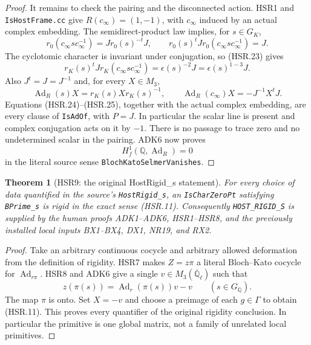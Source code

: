 \documentclass[11pt,a4paper]{article}
\numberwithin{equation}{section}
\newtheorem{theorem}{Theorem}[section]
\theoremstyle{remark}\newtheorem{remark}[theorem]{Remark}
\begin{document}
\begin{proof}
It remains to check the pairing and the disconnected action.
HSR1 and \texttt{Is\allowbreak Host\allowbreak Frame.\allowbreak cc} give
$R(c_\infty)=(1,-1)$, with $c_\infty$ induced by an actual
complex embedding.  The semidirect-product law implies, for
$s\in G_K$,
\[
 r_0(c_\infty s c_\infty^{-1})
      =Jr_0(s)^{-t}J,\qquad
 r_0(s)^tJr_0(c_\infty s c_\infty^{-1})=J.
\]
The cyclotomic character is invariant under conjugation, so
(HSR.23) gives
\[
 r_K(s)^tJr_K(c_\infty s c_\infty^{-1})
                       =\epsilon(s)^{-2}J
                       =\epsilon(s)^{1-3}J.
 \tag{HSR.24}
\]
Also $J^t=J=J^{-1}$ and, for every $X\in M_3$,
\[
 \operatorname{Ad}_R(s)X=r_K(s)Xr_K(s)^{-1},\qquad
 \operatorname{Ad}_R(c_\infty)X=-J^{-1}X^tJ.
 \tag{HSR.25}
\]
Equations (HSR.24)--(HSR.25), together with the actual complex
embedding, are every clause of \texttt{Is\allowbreak Ad\allowbreak Of}, with $P=J$.
In particular the scalar line is present and complex conjugation
acts on it by $-1$.  There is no passage to trace zero and no
undetermined scalar in the pairing.  ADK6 now proves
\[
 H^1_f(\mathbb Q,\operatorname{Ad}_R)=0
\]
in the literal source sense \texttt{Bloch\allowbreak Kato\allowbreak Selmer\allowbreak Vanishes}.
\end{proof}

\begin{theorem}[HSR9: the original HostRigid\_\allowbreak s statement]
\label{claim:HSR9}
For every choice of data quantified in the source's
\texttt{Host\allowbreak Rigid\_\allowbreak s}, an \texttt{Is\allowbreak Char\allowbreak Zero\allowbreak Pt} satisfying
\texttt{BPrime\_\allowbreak s} is rigid in the exact sense (HSR.11).
Consequently \texttt{HOST\_\allowbreak RIGID\_\allowbreak S} is supplied by the
human proofs ADK1--ADK6, HSR1--HSR8, and the previously installed
local inputs BX1--BX4, DX1, NR19, and RX2.
\end{theorem}
\begin{proof}
Take an arbitrary continuous cocycle and arbitrary allowed
deformation from the definition of rigidity.  HSR7 makes
$Z=z\pi$ a literal Bloch--Kato cocycle for
$\operatorname{Ad}_{r\pi}$.  HSR8 and ADK6 give a single
$v\in M_3(\overline{\mathbb Q}_\ell)$ such that
\[
 z(\pi(s))=\operatorname{Ad}_r(\pi(s))v-v
                       \qquad(s\in G_{\mathbb Q}).
\]
The map $\pi$ is onto.  Set $X=-v$ and choose a preimage of
each $g\in\Gamma$ to obtain (HSR.11).  This proves every
quantifier of the original rigidity conclusion.  In particular
the primitive is one global matrix, not a family of unrelated
local primitives.
\end{proof}
\end{document}
